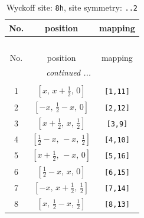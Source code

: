 \documentclass[fleqn,8pt]{jsarticle}
\begin{document}
\begin{longtable}{ccc}
\caption{Wyckoff site: {\tt 8h}, site symmetry: {\tt ..2}}
 \\
 \hline \hline
No. & position & mapping \\ \hline \endfirsthead

\multicolumn{2}{l}{\tablename\ \thetable{}} \\
 \hline \hline
No. & position & mapping \\ \hline \endhead

 \hline \hline
\multicolumn{2}{r}{\footnotesize\it continued ...} \\ \endfoot

 \hline \hline
\multicolumn{2}{r}{} \\ \endlastfoot

1 & $\left[ x,\, x + \frac{1}{2},\, 0 \right]$ & {\tt [1,11]} \\ \hline
2 & $\left[ - x,\, \frac{1}{2} - x,\, 0 \right]$ & {\tt [2,12]} \\ \hline
3 & $\left[ x + \frac{1}{2},\, x,\, \frac{1}{2} \right]$ & {\tt [3,9]} \\ \hline
4 & $\left[ \frac{1}{2} - x,\, - x,\, \frac{1}{2} \right]$ & {\tt [4,10]} \\ \hline
5 & $\left[ x + \frac{1}{2},\, - x,\, 0 \right]$ & {\tt [5,16]} \\ \hline
6 & $\left[ \frac{1}{2} - x,\, x,\, 0 \right]$ & {\tt [6,15]} \\ \hline
7 & $\left[ - x,\, x + \frac{1}{2},\, \frac{1}{2} \right]$ & {\tt [7,14]} \\ \hline
8 & $\left[ x,\, \frac{1}{2} - x,\, \frac{1}{2} \right]$ & {\tt [8,13]} \\
\end{longtable}
\renewcommand{\arraystretch}{1.2}
\end{document}
